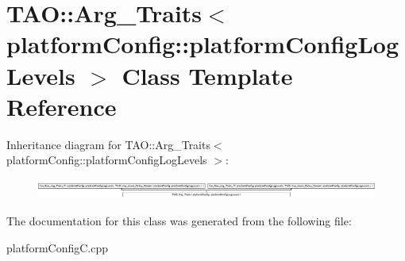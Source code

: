 \section{T\+AO\+:\+:Arg\+\_\+\+Traits$<$ platform\+Config\+:\+:platform\+Config\+Log\+Levels $>$ Class Template Reference}
\label{classTAO_1_1Arg__Traits_3_01platformConfig_1_1platformConfigLogLevels_01_4}
Inheritance diagram for T\+AO\+:\+:Arg\+\_\+\+Traits$<$ platform\+Config\+:\+:platform\+Config\+Log\+Levels $>$\+:\begin{figure}[H]
\begin{center}
\leavevmode
\includegraphics[height=0.661939cm]{classTAO_1_1Arg__Traits_3_01platformConfig_1_1platformConfigLogLevels_01_4}
\end{center}
\end{figure}


The documentation for this class was generated from the following file\+:\begin{DoxyCompactItemize}
\item 
platform\+Config\+C.\+cpp\end{DoxyCompactItemize}
